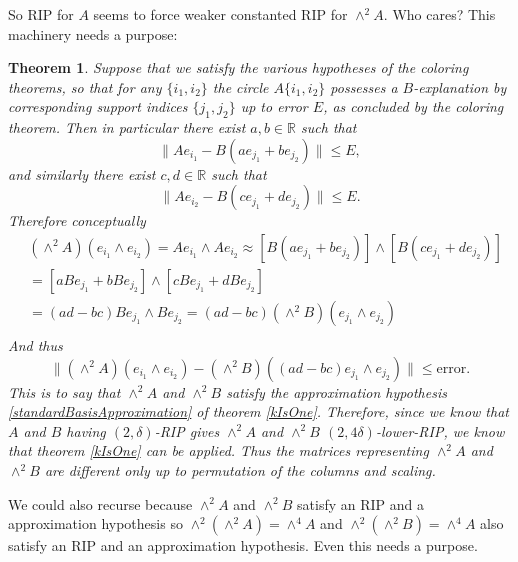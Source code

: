 \documentclass[11pt]{amsart}
\newtheorem{theorem}{Theorem}
\newcommand{\R}{\mathbb{R}}
\begin{document}
So RIP for $A$ seems to force weaker constanted RIP for $\wedge^2 A$.  Who cares?  This machinery needs a purpose:
\begin{theorem}
Suppose that we satisfy the various hypotheses of the coloring theorems, so that for any $\{i_1,i_2\}$ the circle $A\{i_1,i_2\}$ 
possesses a $B$-explanation by corresponding support indices $\{j_1,j_2\}$ up to error $E$, as concluded by the coloring theorem.
Then in particular there exist $a,b\in \R$ such that  \[\|Ae_{i_1}-B(ae_{j_1}+be_{j_2})\|\leq E,\]
and similarly there exist $c,d\in \R$ such that  \[\|Ae_{i_2}-B(ce_{j_1}+de_{j_2})\|\leq E.\]
Therefore conceptually 
\begin{align*}
&(\wedge^2A)(e_{i_1}\wedge e_{i_2})=Ae_{i_1}\wedge Ae_{i_2}\approx  [B(ae_{j_1}+be_{j_2})]\wedge [B(ce_{j_1}+de_{j_2})] \\
&=[aBe_{j_1}+bBe_{j_2}]\wedge [cBe_{j_1}+dBe_{j_2}] \\
&=(ad-bc)Be_{j_1}\wedge Be_{j_2}=(ad-bc)(\wedge^2B)(e_{j_1}\wedge e_{j_2})\\
\end{align*}
And thus
\[\|(\wedge^2A)(e_{i_1}\wedge e_{i_2})-(\wedge^2 B)\left((ad-bc)e_{j_1}\wedge e_{j_2}\right)\|\leq \text{error}.\]
This is to say that $\wedge^2A$ and $\wedge^2B$ satisfy the approximation hypothesis \ref{standardBasisApproximation} of theorem \ref{kIsOne}.
Therefore, since we know that $A$ and $B$ having $(2,\delta)$-RIP gives $\wedge^2A$ and $\wedge^2B$ $(2,4\delta)$-lower-RIP,
we know that theorem \ref{kIsOne} can be applied.  Thus the matrices representing $\wedge^2A$ and $\wedge^2B$ are different only up to permutation 
of the columns and
scaling.
\end{theorem}
We could also recurse because $\wedge^2A$ and $\wedge^2B$ satisfy an RIP and a approximation hypothesis so  
 $\wedge^2(\wedge^2A)=\wedge^4A$ and $\wedge^2(\wedge^2B)=\wedge^4A$ also satisfy an RIP and an approximation hypothesis.
Even this needs a purpose.


\end{document}
